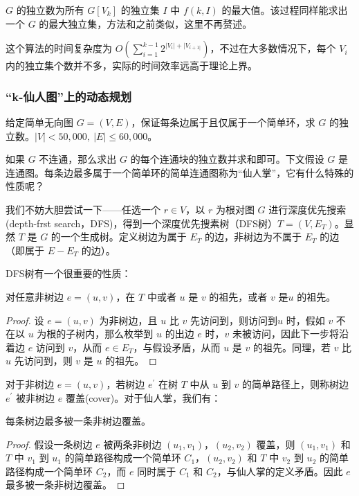\documentclass[lang=cn,11pt,a4paper]{elegantpaper}
\begin{document}
$G$ 的独立数为所有 $G[V_k]$ 的独立集 $I$ 中 $f(k, I)$ 的最大值。该过程同样能求出一个 $G$ 的最大独立集，方法和之前类似，这里不再赘述。

这个算法的时间复杂度为 $O(\sum_{i = 1}^{k - 1}2^{|V_i| + |V_{i + 1|}})$，不过在大多数情况下，每个 $V_i$ 内的独立集个数并不多，实际的时间效率远高于理论上界。

\subsubsection{“k-仙人图”上的动态规划}
\begin{example}
    给定简单无向图 $G = (V, E)$，保证每条边属于且仅属于一个简单环，求 $G$ 的独立数。$|V| < 50,000,\ |E| \le 60,000$。
\end{example}

如果 $G$ 不连通，那么求出 $G$ 的每个连通块的独立数并求和即可。下文假设 $G$ 是连通图。每条边最多属于一个简单环的简单连通图称为“仙人掌”，它有什么特殊的性质呢？

我们不妨大胆尝试一下——任选一个 $r \in V$，以 $r$ 为根对图 $G$ 进行深度优先搜索 (depth-frst search，DFS)，得到一个深度优先搜素树（DFS树）$T=(V,E_T)$。显然 $T$ 是 $G$ 的一个生成树。定义树边为属于 $E_T$ 的边，非树边为不属于 $E_T$ 的边（即属于 $E - E_T$ 的边）。

DFS树有一个很重要的性质：
\begin{theorem}
    对任意非树边 $e = (u, v)$，在 $T$ 中或者 $u$ 是 $v$ 的祖先，或者 $v$ 是$u$ 的祖先。
\end{theorem}
\begin{proof}
    设 $e = (u, v)$ 为非树边，且 $u$ 比 $v$ 先访问到，则访问到$u$ 时，假如 $v$ 不在以 $u$ 为根的子树内，那么枚举到 $u$ 的出边 $e$ 时，$v$ 未被访问，因此下一步将沿着边 $e$ 访问到 $v$，从而 $e \in E_T$，与假设矛盾，从而 $u$ 是 $v$ 的祖先。同理，若 $v$ 比 $u$ 先访问到，则 $v$ 是 $u$ 的祖先。
\end{proof}

对于非树边 $e = (u, v)$，若树边 $e^{'}$ 在树 $T$ 中从 $u$ 到 $v$ 的简单路径上，则称树边 $e^{'}$ 被非树边 $e$ 覆盖(cover)。对于仙人掌，我们有：

\begin{theorem}
    每条树边最多被一条非树边覆盖。
\end{theorem}
\begin{proof}
    假设一条树边 $e$ 被两条非树边 $(u_1, v_1)$，$(u_2, v_2)$ 覆盖，则 $(u_1, v_1)$ 和 $T$ 中 $v_1$ 到 $u_1$ 的简单路径构成一个简单环 $C_1$，$(u_2, v_2)$ 和 $T$ 中 $v_2$ 到 $u_2$ 的简单路径构成一个简单环 $C_2$，而 $e$ 同时属于 $C_1$ 和 $C_2$，与仙人掌的定义矛盾。因此 $e$ 最多被一条非树边覆盖。
\end{proof}
\end{document}
